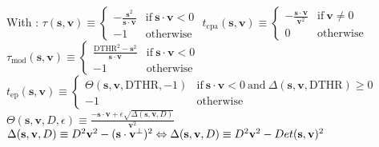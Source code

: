 With : \newline 
$\tau(\mathbf{s},\mathbf v) \equiv \left\{
\begin{array}{ll}
- \frac{\mathbf{s}^2}{\mathbf{s} \cdot \mathbf{v}} & \mathrm{if} ~ \mathbf{s} \cdot \mathbf{v} < 0\\
- 1  & \mathrm{otherwise}
\end{array}
\right. $\newline 
$t_{\mathrm{cpa}}(\mathbf{s},\mathbf v) \equiv \left\{
\begin{array}{ll}
- \frac{\mathbf{s} \cdot \mathbf{v}}{\mathbf{v}^2} & \mathrm{if} ~ \mathbf{v} \neq 0\\
0  & \mathrm{otherwise}
\end{array}
\right. $\newline 
$\tau_{\mathrm{mod}}(\mathbf{s},\mathbf v) \equiv \left\{
\begin{array}{ll}
\frac{\mathrm{DTHR}^2-\mathbf{s}^2}{\mathbf{s} \cdot \mathbf{v}} & \mathrm{if} ~ \mathbf{s} \cdot \mathbf{v} < 0\\
-1  & \mathrm{otherwise}
\end{array}
\right. $ \newline
$t_{\mathrm{ep}}(\mathbf{s},\mathbf v) \equiv \left\{
\begin{array}{ll}
\Theta (\mathbf{s},\mathbf{v}, \mathrm{DTHR}, -1) & \mathrm{if} ~ \mathbf{s} \cdot \mathbf{v} < 0 ~\mathrm{and}~ \Delta(\mathbf{s},\mathbf v, \mathrm{DTHR}) \ge 0\\
-1  & \mathrm{otherwise}
\end{array}
\right. $ \newline
$\Theta (\mathbf{s},\mathbf{v}, D, \epsilon) \equiv \frac{-\mathbf{s}\cdot\mathbf{v} + \epsilon \sqrt{\Delta(\mathbf{s},\mathbf{v},D)}}{\mathbf{v}^2}$\newline
$\Delta(\mathbf{s},\mathbf{v},D) \equiv D^2\mathbf{v}^2 - (\mathbf{s}\cdot\mathbf{v}^{\perp})^2 \\
\Leftrightarrow \Delta(\mathbf{s},\mathbf{v},D) \equiv D^2\mathbf{v}^2 - Det(\mathbf{s},\mathbf{v})^2$